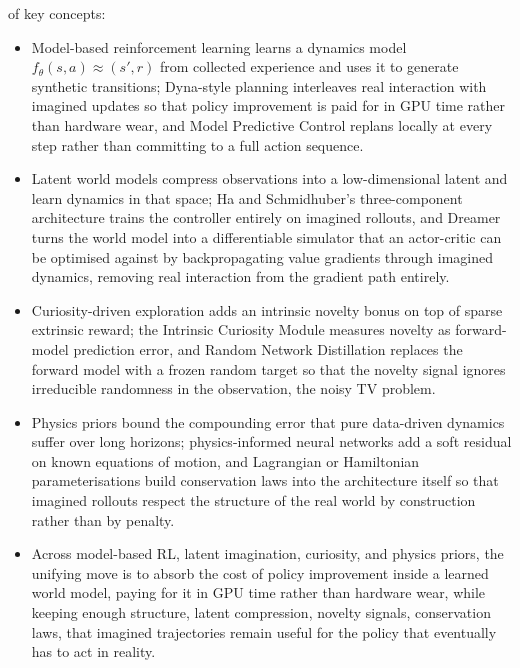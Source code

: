 \vspace{1.5em}

 of key concepts:

\begin{itemize}
    \item Model-based reinforcement learning learns a dynamics model $f_\theta(s, a) \approx (s', r)$ from collected experience and uses it to generate synthetic transitions; Dyna-style planning interleaves real interaction with imagined updates so that policy improvement is paid for in GPU time rather than hardware wear, and Model Predictive Control replans locally at every step rather than committing to a full action sequence.
    \item Latent world models compress observations into a low-dimensional latent and learn dynamics in that space; Ha and Schmidhuber's three-component architecture trains the controller entirely on imagined rollouts, and Dreamer turns the world model into a differentiable simulator that an actor-critic can be optimised against by backpropagating value gradients through imagined dynamics, removing real interaction from the gradient path entirely.
    \item Curiosity-driven exploration adds an intrinsic novelty bonus on top of sparse extrinsic reward; the Intrinsic Curiosity Module measures novelty as forward-model prediction error, and Random Network Distillation replaces the forward model with a frozen random target so that the novelty signal ignores irreducible randomness in the observation, the noisy TV problem.
    \item Physics priors bound the compounding error that pure data-driven dynamics suffer over long horizons; physics-informed neural networks add a soft residual on known equations of motion, and Lagrangian or Hamiltonian parameterisations build conservation laws into the architecture itself so that imagined rollouts respect the structure of the real world by construction rather than by penalty.
    \item Across model-based RL, latent imagination, curiosity, and physics priors, the unifying move is to absorb the cost of policy improvement inside a learned world model, paying for it in GPU time rather than hardware wear, while keeping enough structure, latent compression, novelty signals, conservation laws, that imagined trajectories remain useful for the policy that eventually has to act in reality.
\end{itemize}

\vspace{2.5em}

